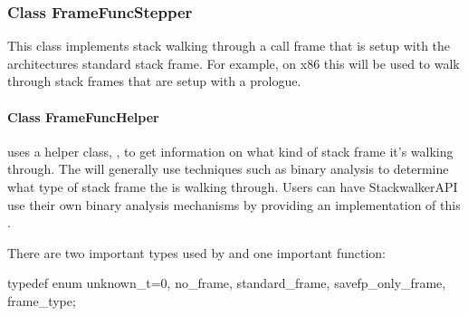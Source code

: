 \subsubsection{Class FrameFuncStepper}
This class implements stack walking through a call frame that is setup with the
architectures standard stack frame. For example, on x86 this  will
be used to walk through stack frames that are setup with a  prologue. 

\paragraph{Class FrameFuncHelper}

 uses a helper class, , to get information on
what kind of stack frame it's walking through. The  will
generally use techniques such as binary analysis to determine what type of stack
frame the  is walking through. Users can have StackwalkerAPI use
their own binary analysis mechanisms by providing an implementation of this
.

There are two important types used by  and one important function:
\begin{apient}
typedef enum {
    unknown_t=0,
    no_frame,
    standard_frame,
    savefp_only_frame,
} frame_type;
\end{apient}

